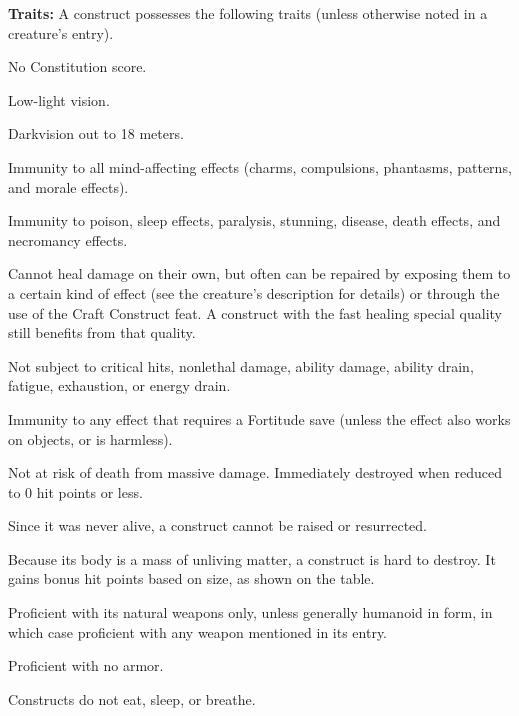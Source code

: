 \textbf{Traits:} A construct possesses the following traits (unless otherwise noted in a creature's entry).
\begin{itemize*}
\item No Constitution score.
\item Low-light vision.
\item Darkvision out to 18 meters.
\item Immunity to all mind-affecting effects (charms, compulsions, phantasms, patterns, and morale effects).
\item Immunity to poison, sleep effects, paralysis, stunning, disease, death effects, and necromancy effects.
\item Cannot heal damage on their own, but often can be repaired by exposing them to a certain kind of effect (see the creature's description for details) or through the use of the Craft Construct feat. A construct with the fast healing special quality still benefits from that quality.
\item Not subject to critical hits, nonlethal damage, ability damage, ability drain, fatigue, exhaustion, or energy drain.
\item Immunity to any effect that requires a Fortitude save (unless the effect also works on objects, or is harmless).
\item Not at risk of death from massive damage. Immediately destroyed when reduced to 0 hit points or less.
\item Since it was never alive, a construct cannot be raised or resurrected.
\item Because its body is a mass of unliving matter, a construct is hard to destroy. It gains bonus hit points based on size, as shown on the table.

\item Proficient with its natural weapons only, unless generally humanoid in form, in which case proficient with any weapon mentioned in its entry.
\item Proficient with no armor.
\item Constructs do not eat, sleep, or breathe.
\end{itemize*}

